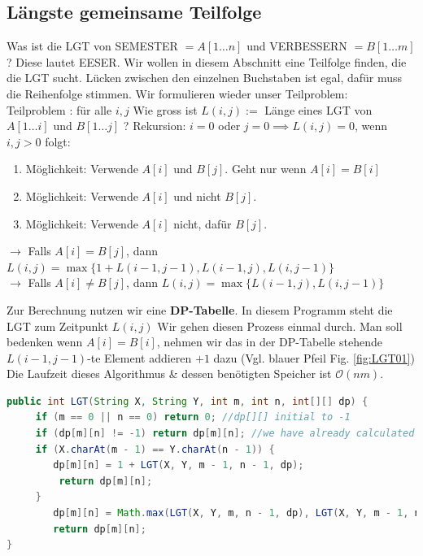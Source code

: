 \documentclass[a4paper]{article}
\begin{document}
\subsection{Längste gemeinsame Teilfolge}
Was ist die LGT von \textsc{SEMESTER} $= A[1\dots n]$ und \textsc{VERBESSERN} $= B[1\dots m]$? Diese lautet \textsc{EESER}.
Wir wollen in diesem Abschnitt eine Teilfolge finden, die die LGT sucht. Lücken zwischen den einzelnen Buchstaben ist egal, dafür muss die Reihenfolge stimmen. Wir formulieren wieder unser Teilproblem:\\
Teilproblem : für alle $i,j$ Wie gross ist $L(i,j) :=$ Länge eines LGT von $A[1\dots i]$ und $B[1\dots j]$ ?
Rekursion: $i = 0$ oder $j = 0 \implies L(i,j) = 0$, wenn $i,j > 0$   folgt:
\begin{enumerate}
    \item Möglichkeit: Verwende $A[i]$ und $B[j]$. Geht nur wenn $A[i] = B[i]$
    \item Möglichkeit: Verwende $A[i]$ und nicht $B[j]$.
    \item Möglichkeit: Verwende $A[i]$ nicht, dafür $B[j]$.
\end{enumerate}
$\rightarrow$ Falls  $A[i] = B[j]$, dann $L(i,j) = \max\lbrace 1 + L(i-1, j-1), L(i-1, j), L(i, j-1) \rbrace$ \\
$\rightarrow$ Falls  $A[i] \neq B[j]$, dann $L(i,j) = \max\lbrace L(i-1, j), L(i, j-1) \rbrace$

Zur Berechnung nutzen wir eine \textbf{DP-Tabelle}. In diesem Programm steht die LGT zum Zeitpunkt $L(i,j)$
Wir gehen diesen Prozess einmal durch. Man soll bedenken wenn $A[i] = B[i]$, nehmen wir das in der DP-Tabelle stehende $L(i-1,j-1)$-te Element addieren $+1$ dazu (Vgl. blauer Pfeil Fig. \ref{fig:LGT01}) 
Die Laufzeit dieses Algorithmus \& dessen benötigten Speicher ist $\mathcal{O}(nm)$.

\begin{lstlisting}[language = Java , commentstyle=\color{teal}]
public int LGT(String X, String Y, int m, int n, int[][] dp) {
     if (m == 0 || n == 0) return 0; //dp[][] initial to -1
     if (dp[m][n] != -1) return dp[m][n]; //we have already calculated value
     if (X.charAt(m - 1) == Y.charAt(n - 1)) {
        dp[m][n] = 1 + LGT(X, Y, m - 1, n - 1, dp);
         return dp[m][n];
     }
        dp[m][n] = Math.max(LGT(X, Y, m, n - 1, dp), LGT(X, Y, m - 1, n, dp));
        return dp[m][n];
}
\end{lstlisting}
\end{document}
